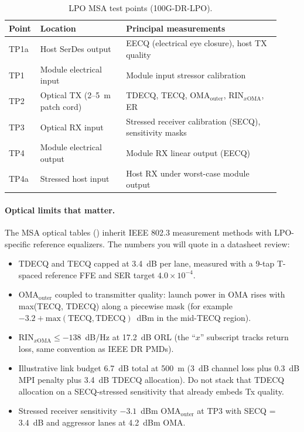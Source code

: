 \begin{table}[ht]
\centering
\caption{LPO MSA test points (100G-DR-LPO).\label{tab:lpo-tp}}
\setlength{\tabcolsep}{4pt}%
\footnotesize
\renewcommand{\arraystretch}{1.25}%
\begin{tabular}{@{}p{0.08\linewidth}p{0.30\linewidth}p{0.54\linewidth}@{}}
\toprule
Point & Location & Principal measurements \\
\midrule
TP1a & Host SerDes output & EECQ (electrical eye closure), host TX quality \\
\addlinespace[1.5em]
TP1 & Module electrical input & Module input stressor calibration \\
\addlinespace[1.5em]
TP2 & Optical TX (2--5~m patch cord) & TDECQ, TECQ, OMA$_{\mathrm{outer}}$, RIN$_{x\mathrm{OMA}}$, ER \\
\addlinespace[1.5em]
TP3 & Optical RX input & Stressed receiver calibration (SECQ), sensitivity masks \\
\addlinespace[1.5em]
TP4 & Module electrical output & Module RX linear output (EECQ) \\
\addlinespace[1.5em]
TP4a & Stressed host input & Host RX under worst-case module output \\
\bottomrule
\end{tabular}
\end{table}

\paragraph{Optical limits that matter.}
The MSA optical tables () inherit IEEE 802.3
measurement methods with LPO-specific reference equalizers. The numbers you will
quote in a datasheet review:

\begin{itemize}
\item TDECQ and TECQ capped at 3.4~dB per lane, measured with a 9-tap T-spaced
      reference FFE and SER target $4.0\times10^{-4}$.
\item OMA$_{\mathrm{outer}}$ coupled to transmitter quality: launch power in OMA
      rises with max(TECQ, TDECQ) along a piecewise mask (for example
      $-3.2 + \mathrm{max}(\mathrm{TECQ},\mathrm{TDECQ})$~dBm in the mid-TECQ
      region).
\item RIN$_{x\mathrm{OMA}} \le -138$~dB/Hz at 17.2~dB ORL (the ``$x$'' subscript
      tracks return loss, same convention as IEEE DR PMDs).
\item Illustrative link budget 6.7~dB total at 500~m (3~dB channel loss plus 0.3~dB
      MPI penalty plus 3.4~dB TDECQ allocation). Do not stack that TDECQ
      allocation on a SECQ-stressed sensitivity that already embeds Tx quality.
\item Stressed receiver sensitivity $-3.1$~dBm OMA$_{\mathrm{outer}}$ at TP3 with
      SECQ = 3.4~dB and aggressor lanes at 4.2~dBm OMA.
\end{itemize}

